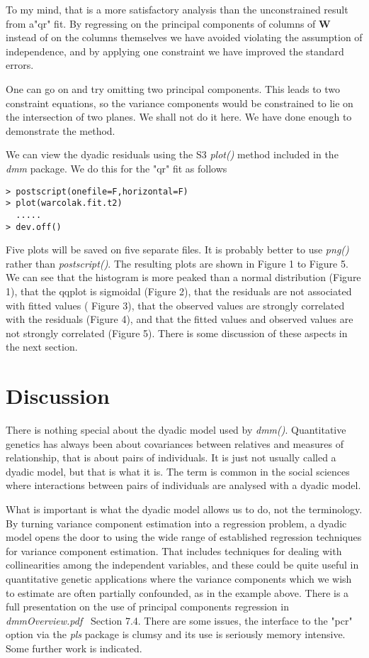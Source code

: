 \documentclass[titlepage]{article}  %
\begin{document}
To my mind, that is a more satisfactory analysis than the unconstrained result from  a"qr" fit. By regressing on the principal components of columns of $\bm{W}$ instead of on the columns themselves we have avoided violating the assumption of independence, and by applying one constraint we have improved the standard errors.

One can go on and try omitting two principal components. This leads to two constraint equations, so the variance components would be constrained to lie on the intersection of two planes. We shall not do it here. We have done enough to demonstrate the method. 

We can view the dyadic residuals using the S3 {\em plot()} method included in the {\em dmm} package. We do this for the "qr" fit as follows

\begin{verbatim}
> postscript(onefile=F,horizontal=F)
> plot(warcolak.fit.t2)
  .....
> dev.off()
\end{verbatim}

Five plots will be saved on five separate files. It is probably better to use {\em png()} rather than {\em postscript()}. The resulting plots are shown in Figure 1 to Figure 5. We can see that the histogram is more peaked than a normal distribution (Figure 1), that the qqplot is sigmoidal (Figure 2), that the residuals are not associated with fitted values ( Figure 3), that the observed values are strongly correlated with the residuals (Figure 4), and that the fitted values and observed values are not strongly correlated (Figure 5). There is some discussion of these aspects in the next section.







\section{Discussion}
There is nothing special about the dyadic model used by {\em dmm()}. Quantitative genetics has always been about covariances between relatives and measures of relationship, that is about pairs of individuals. It is just not usually called a dyadic model, but that is what it is. The term is common in the social sciences where interactions between pairs of individuals  are analysed with a dyadic model.

What is important is what the dyadic model allows us to do, not the terminology. By turning variance component estimation into a regression problem, a dyadic model opens the door to using the wide range of established regression techniques for variance component estimation. That includes techniques for dealing with collinearities among the independent variables, and these could be quite useful in quantitative genetic applications where the variance components which we wish to estimate are often partially confounded, as in the example above. There is a full presentation on the use of principal components regression in {\em dmmOverview.pdf}~\cite{jack:15} Section 7.4. There are some issues, the interface to the "pcr" option via the {\em pls} package is clumsy and its use is seriously memory intensive. Some further work is indicated.
\end{document}
